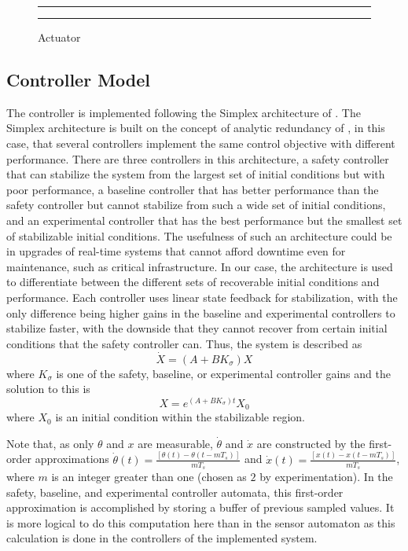 \documentclass[conference]{IEEEtran}
\begin{document}
\begin{figure}[h!]
\centering
  \hrule
	{}
  \hrule
  \caption{Actuator}
  \label{fig:actuator}
\end{figure}

\subsection{Controller Model}

The controller is implemented following the Simplex architecture of \cite{ShaACC1998}.  The Simplex architecture is built on the concept of analytic redundancy of \cite{Bodson1994}, in this case, that several controllers implement the same control objective with different performance.  There are three controllers in this architecture, a safety controller that can stabilize the system from the largest set of initial conditions but with poor performance, a baseline controller that has better performance than the safety controller but cannot stabilize from such a wide set of initial conditions, and an experimental controller that has the best performance but the smallest set of stabilizable initial conditions.  The usefulness of such an architecture could be in upgrades of real-time systems that cannot afford downtime even for maintenance, such as critical infrastructure.  In our case, the architecture is used to differentiate between the different sets of recoverable initial conditions and performance.  Each controller uses linear state feedback for stabilization, with the only difference being higher gains in the baseline and experimental controllers to stabilize faster, with the downside that they cannot recover from certain initial conditions that the safety controller can.  Thus, the system is described as 
\begin{equation}
\dot{X}=\left(A+BK_{\sigma}\right)X
\label{eq:linearStateFeedbackDiffEq}
\end{equation} where $K_{\sigma}$ is one of the safety, baseline, or experimental controller gains and the solution to this is 
\begin{equation}
X=e^{\left(A+BK_{\sigma}\right)t}X_{0}
\label{eq:linearStateFeedbackSolution}
\end{equation} where $X_0$ is an initial condition within the stabilizable region.

Note that, as only $\theta$ and $x$ are measurable, $\dot{\theta}$ and $\dot{x}$ are constructed by the first-order approximations $\dot{\theta}(t)=\frac{[\theta(t)-\theta(t-mT_s)]}{mT_s}$ and $\dot{x}(t)=\frac{[x(t)-x(t-mT_s)]}{mT_s}$, where $m$ is an integer greater than one (chosen as $2$ by experimentation).  In the safety, baseline, and experimental controller automata, this first-order approximation is accomplished by storing a buffer of previous sampled values.  It is more logical to do this computation here than in the sensor automaton as this calculation is done in the controllers of the implemented system.
\end{document}
